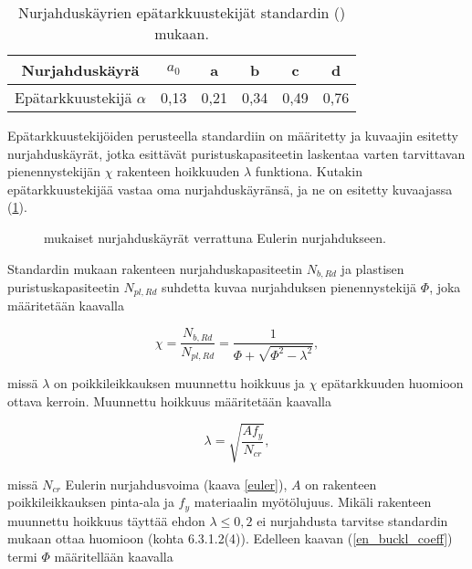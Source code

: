 \documentclass[12pt]{article}
\newenvironment{content}{\pagenumbering{arabic}}{}
\begin{document}
\begin{content}
\begin{table}[htb]
\centering
\caption{Nurjahduskäyrien epätarkkuustekijät standardin (\citeauthor{en1993})  mukaan.}
\begin{tabular}{c c c c c c}
\label{epätarkkuustekijät}

Nurjahduskäyrä & $a_0$ & a & b & c & d \\
\hline
Epätarkkuustekijä $\alpha$ & 0,13 & 0,21 & 0,34 & 0,49 & 0,76
\end{tabular}
\end{table}

Epätarkkuustekijöiden perusteella standardiin on määritetty ja kuvaajin esitetty nurjahduskäyrät, jotka esittävät puristuskapasiteetin laskentaa varten tarvittavan pienennystekijän $\chi$ rakenteen hoikkuuden $\lambda$ funktiona. Kutakin epätarkkuustekijää vastaa oma nurjahduskäyränsä, ja ne on esitetty kuvaajassa (\ref{fig:nurjahduskäyräkuvaaja}). 

\begin{figure}[htb]

\caption{\citeauthor{en1993} mukaiset nurjahduskäyrät verrattuna Eulerin nurjahdukseen. }
\label{fig:nurjahduskäyräkuvaaja}
\end{figure}

Standardin mukaan rakenteen nurjahduskapasiteetin $N_{b,Rd}$ ja plastisen puristuskapasiteetin $N_{pl,Rd}$ suhdetta kuvaa nurjahduksen pienennystekijä $\Phi$, joka määritetään kaavalla

\begin{equation}
\label{en_buckl_coeff}
\chi = \frac{N_{b,Rd}}{N_{pl,Rd}} =\frac{1}{\Phi + \sqrt{\Phi^2-\lambda^2}},
\end{equation}

missä $\lambda$ on poikkileikkauksen muunnettu hoikkuus ja $\chi$ epätarkkuuden huomioon ottava kerroin. Muunnettu hoikkuus määritetään kaavalla 

\begin{equation}
\label{hoikkuus}
\lambda = \sqrt{\frac{A f_y}{N_{cr}}},
\end{equation}

missä $N_{cr}$ Eulerin nurjahdusvoima (kaava \ref{euler}), $A$ on rakenteen poikkileikkauksen pinta-ala ja $f_y$ materiaalin myötölujuus. Mikäli rakenteen muunnettu hoikkuus täyttää ehdon $\lambda \leq 0,2$ ei nurjahdusta tarvitse standardin mukaan ottaa huomioon (kohta 6.3.1.2(4)). Edelleen kaavan (\ref{en_buckl_coeff}) termi $\Phi$ määritellään kaavalla


\end{content}
\end{document}
